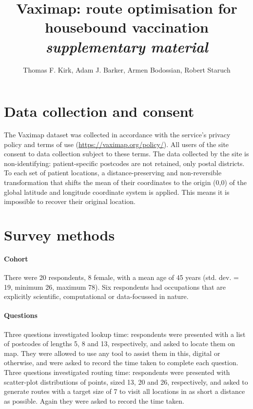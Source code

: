 \documentclass{article}
\def\vm{Vaximap}
\begin{document}
\linenumbers
\doublespacing

\title{Vaximap: route optimisation for housebound vaccination\\
\textit{supplementary material}}
\author{Thomas F. Kirk, Adam J. Barker, Armen Bodossian, Robert Staruch}
\maketitle

\section{Data collection and consent}

The \vm{} dataset was collected in accordance with the service's privacy policy and terms of use (\url{https://vaximap.org/policy/}). All users of the site consent to data collection subject to these terms. The data collected by the site is non-identifying: patient-specific postcodes are not retained, only postal districts. To each set of patient locations, a distance-preserving and non-reversible transformation that shifts the mean of their coordinates to the origin (0,0) of the global latitude and longitude coordinate system is applied. This means it is impossible to recover their original location. 

\section{Survey methods}

\paragraph{Cohort} There were 20 respondents, 8 female, with a mean age of 45 years (std. dev. = 19, minimum 26, maximum 78). Six respondents had occupations that are explicitly scientific, computational or data-focussed in nature. 

\paragraph{Questions} Three questions investigated lookup time: respondents were presented with a list of postcodes of lengths 5, 8 and 13, respectively, and asked to locate them on map. They were allowed to use any tool to assist them in this, digital or otherwise, and were asked to record the time taken to complete each question. Three questions investigated routing time: respondents were presented with scatter-plot distributions of points, sized 13, 20 and 26, respectively, and asked to generate routes with a target size of 7 to visit all locations in as short a distance as possible. Again they were asked to record the time taken.
\end{document}
